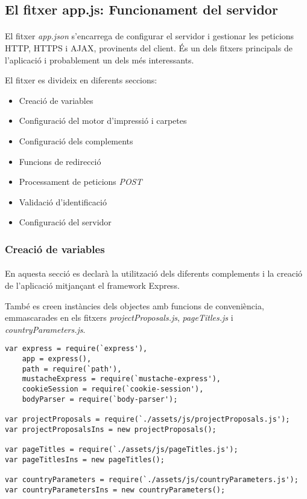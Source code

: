 \subsection{El fitxer app.js: Funcionament del servidor}

    \paragraph{}
    El fitxer \emph{app.json} s'encarrega de configurar el servidor i gestionar les peticions HTTP, HTTPS i AJAX, provinents del client. És un dels fitxers principals de l'aplicació i probablement un dels més interessants.

    El fitxer es divideix en diferents seccions:

    \begin{itemize}
        \item Creació de variables
        \item Configuració del motor d'impressió i carpetes
        \item Configuració dels complements
        \item Funcions de redirecció
        \item Processament de peticions \emph{POST}
        \item Validació d'identificació
        \item Configuració del servidor
    \end{itemize}


    \subsubsection{Creació de variables}

    \paragraph{}
    En aquesta secció es declarà la utilització dels diferents complements i la creació de l'aplicació mitjançant el framework Express.

    També es creen instàncies dels objectes amb funcions de conveniència, em\-mas\-ca\-ra\-des en els fitxers \emph{projectProposals.js}, \emph{pageTitles.js} i \emph{countryParameters.js}.

    \begin{lstlisting}[style=rawOwn,caption={Declaració de variables en el servidor}]
var express = require(`express'),
    app = express(),
    path = require(`path'),
    mustacheExpress = require(`mustache-express'),
    cookieSession = require(`cookie-session'),
    bodyParser = require(`body-parser');

var projectProposals = require(`./assets/js/projectProposals.js');
var projectProposalsIns = new projectProposals();

var pageTitles = require(`./assets/js/pageTitles.js');
var pageTitlesIns = new pageTitles();

var countryParameters = require(`./assets/js/countryParameters.js');
var countryParametersIns = new countryParameters();
    \end{lstlisting}


